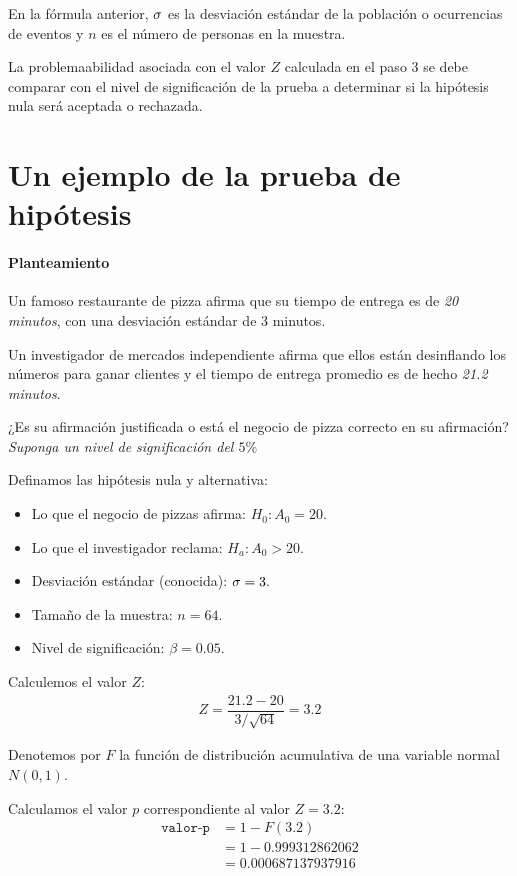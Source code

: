 En la fórmula anterior, $\sigma$ es la desviación estándar de la población o ocurrencias de eventos y $n$ es el número de personas en la muestra.


La problemaabilidad asociada con el valor $Z$ calculada en el paso $3$ se debe comparar con el nivel de significación de la prueba a determinar si la hipótesis nula será aceptada o rechazada.


\section{Un ejemplo de la prueba de hipótesis}
\paragraph{Planteamiento}
Un famoso restaurante de pizza afirma que su tiempo de entrega es de \emph{20 minutos}, con una desviación estándar de 3 minutos. 

Un investigador de mercados independiente afirma que ellos están desinflando los números para ganar clientes y el tiempo de entrega promedio es de hecho \emph{21.2 minutos}.

¿Es su afirmación justificada o está el negocio de pizza correcto en su afirmación? \emph{Suponga un nivel de significación del $5\%$}


Definamos las hipótesis nula y alternativa:
\begin{itemize}
 \item Lo que el negocio de pizzas afirma: $H_{0}:A_{0}=20.$
 \item Lo que el investigador reclama:
 $H_{a}: A_{0}>20.$
 \item Desviación estándar (conocida): $\sigma=3.$
 \item Tamaño de la muestra: $n=64.$
 \item Nivel de significación: $\beta=0.05.$
\end{itemize}


Calculemos el valor $Z$:
\begin{align}
 Z=\dfrac{21.2-20}{3/\sqrt{64}}=3.2
\end{align}



Denotemos por $F$ la función de distribución acumulativa de una variable normal $N(0,1).$ 

Calculamos el valor $p$ correspondiente al valor $Z=3.2$:
\begin{align}
 \texttt{valor-p}&=1 - F(3.2)\\
 &=1-0.999312862062\\
 &= 0.000687137937916
\end{align}



